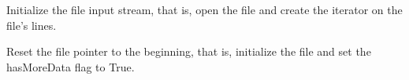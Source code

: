 \documentclass[letterpaper,10pt,english]{sphinxmanual}
\begin{document}
\begin{fulllineitems}
\begin{fulllineitems}
\begin{quote}
\begin{description}
\end{description}\end{quote}

\end{fulllineitems}


\begin{fulllineitems}
\label{common:common_data_importer.CommonFileDataImporter.init_file_input_stream}
Initialize the file input stream, that is, open the file and create the iterator on the file's lines.

\end{fulllineitems}


\begin{fulllineitems}
\label{common:common_data_importer.CommonFileDataImporter.rewind}
Reset the file pointer to the beginning, that is, initialize the file and set the hasMoreData flag to True.

\end{fulllineitems}


\end{fulllineitems}

\end{document}
